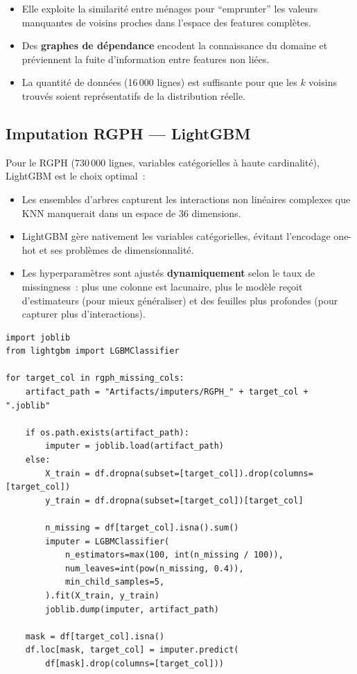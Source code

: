 \documentclass[12pt,a4paper]{report}
\begin{document}
\begin{itemize}
  \item Elle exploite la similarité entre ménages pour ``emprunter'' les valeurs manquantes de voisins proches dans l'espace des features complètes.
  \item Des \textbf{graphes de dépendance} encodent la connaissance du domaine et préviennent la fuite d'information entre features non liées.
  \item La quantité de données (16\,000 lignes) est suffisante pour que les $k$ voisins trouvés soient représentatifs de la distribution réelle.
\end{itemize}

\subsection{Imputation RGPH --- LightGBM}

Pour le RGPH (730\,000 lignes, variables catégorielles à haute cardinalité), LightGBM est le choix optimal~:

\begin{itemize}
  \item Les ensembles d'arbres capturent les interactions non linéaires complexes que KNN manquerait dans un espace de 36 dimensions.
  \item LightGBM gère nativement les variables catégorielles, évitant l'encodage one-hot et ses problèmes de dimensionnalité.
  \item Les hyperparamètres sont ajustés \textbf{dynamiquement} selon le taux de missingness~: plus une colonne est lacunaire, plus le modèle reçoit d'estimateurs (pour mieux généraliser) et des feuilles plus profondes (pour capturer plus d'interactions).
\end{itemize}

\begin{lstlisting}[caption={Pipeline d'imputation LightGBM pour le RGPH -- version simplifiee}]
import joblib
from lightgbm import LGBMClassifier

for target_col in rgph_missing_cols:
    artifact_path = "Artifacts/imputers/RGPH_" + target_col + ".joblib"

    if os.path.exists(artifact_path):
        imputer = joblib.load(artifact_path)
    else:
        X_train = df.dropna(subset=[target_col]).drop(columns=[target_col])
        y_train = df.dropna(subset=[target_col])[target_col]

        n_missing = df[target_col].isna().sum()
        imputer = LGBMClassifier(
            n_estimators=max(100, int(n_missing / 100)),
            num_leaves=int(pow(n_missing, 0.4)),
            min_child_samples=5,
        ).fit(X_train, y_train)
        joblib.dump(imputer, artifact_path)

    mask = df[target_col].isna()
    df.loc[mask, target_col] = imputer.predict(
        df[mask].drop(columns=[target_col]))
\end{lstlisting}
\end{document}
